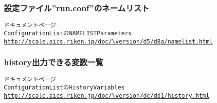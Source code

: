 \subsubsection{設定ファイル''run.conf''のネームリスト} \label{subsubsec:namelist_run}

\begin{alltt}
 \scalerm ドキュメントページ
 Configuration List の NAMELIST Parameters 
 \url{http://scale.aics.riken.jp/doc/\version/d5/d8a/namelist.html}
\end{alltt}


\subsubsection{history出力できる変数一覧} \label{subsubsec:histroy_item}

\begin{alltt}
 \scalerm ドキュメントページ
 Configuration List の History Variables
 \url{http://scale.aics.riken.jp/doc/\version/dc/dd1/history.html}
\end{alltt}




